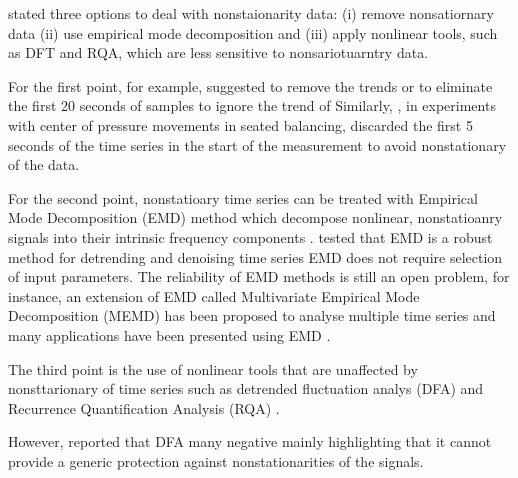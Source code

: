\cite{caballero2014} stated three options to deal with nonstaionarity data:
(i) remove nonsatiornary data (ii) use empirical mode decomposition and (iii) apply 
nonlinear tools, such as DFT and RQA, which are less sensitive to nonsariotuarntry data.

For the first point, for example, \cite{carroll1993} suggested to remove the trends 
or to eliminate the first 20 seconds of samples to ignore the trend of 
Similarly, \cite{vandieen2010}, in experiments with
center of pressure movements in seated balancing,
discarded the first 5 seconds of the time series in the start of the measurement
to avoid nonstationary of the data.

For the second point, nonstatioary time series can be treated with 
Empirical Mode Decomposition (EMD) method which decompose nonlinear, 
nonstatioanry signals into their intrinsic frequency components \cite{huang1998, wu-huang2004, wu-huang2009}.
\cite{flandrin2004, costa2007} tested that EMD is a robust method for 
detrending and denoising time series EMD does not require selection of input parameters.
The reliability of EMD methods is still an open problem, for instance, 
an extension of EMD called Multivariate Empirical Mode Decomposition (MEMD) has been
proposed to analyse multiple time series \cite{rehman2010, mandic2013}
and many applications have been presented using EMD \cite{wu-hu2006, costa2007, daubechies2011, bonnet2014, mert2018}.

The third point is the use of nonlinear tools that are unaffected by nonsttarionary 
of time series such as detrended fluctuation analys (DFA) \cite{hausdorff1995}
and Recurrence Quantification Analysis (RQA) \cite{zbilut1992, trulla1996, marwan2008}. 


However, \cite{bryce2012} reported that DFA many negative mainly
highlighting that it cannot provide a generic protection against 
nonstationarities of the signals.





